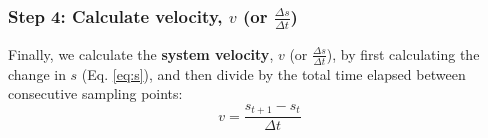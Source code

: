 \documentclass[12pt,twoside,openany]{reedthesis}
\begin{document}
\subsubsection{\texorpdfstring{Step 4: Calculate velocity, \(v\) (or
\(\frac {\Delta s}{\Delta t}\))}{Step 4: Calculate velocity, v (or \textbackslash{}frac \{\textbackslash{}Delta s\}\{\textbackslash{}Delta t\})}}\label{step-4-calculate-velocity-v-or-frac-delta-sdelta-t}

Finally, we calculate the \textbf{system velocity}, \(v\) (or
\(\frac{\Delta s}{\Delta t}\)), by first calculating the change in \(s\)
(Eq. \eqref{eq:s}), and then divide by the total time elapsed between
consecutive sampling points:
\begin{equation}
 v = \frac {s_{t+1}-s_{t}}{\Delta t} 
\label{eq:velocity}
\end{equation}
\end{document}
